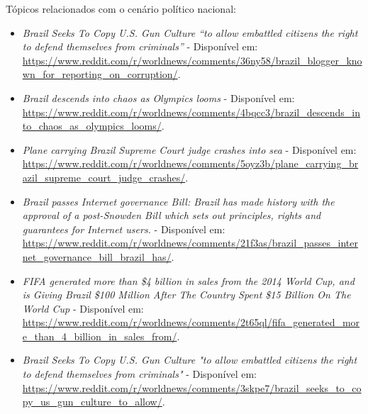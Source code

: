 Tópicos relacionados com o cenário político nacional:
\begin{itemize}
  \item
  \textit{Brazil Seeks To Copy U.S. Gun Culture ``to allow embattled
  citizens the right to defend themselves from
  criminals''} - Disponível em: 
  \url{https://www.reddit.com/r/worldnews/comments/36ny58/brazil_blogger_known_for_reporting_on_corruption/}.
  \item
  \textit{Brazil descends into chaos as Olympics looms} - Disponível em: 
  \url{https://www.reddit.com/r/worldnews/comments/4bqcc3/brazil_descends_into_chaos_as_olympics_looms/}.
  \item
  \textit{Plane carrying Brazil Supreme Court judge crashes into sea}
   - Disponível em: \url{https://www.reddit.com/r/worldnews/comments/5oyz3b/plane_carrying_brazil_supreme_court_judge_crashes/}.
  \item
  \textit{Brazil passes Internet governance Bill: Brazil has made history with
  the approval of a post-Snowden Bill which sets out principles, rights and guarantees for Internet users.} - Disponível em: \url{https://www.reddit.com/r/worldnews/comments/21f3as/brazil_passes_internet_governance_bill_brazil_has/}.
  \item
  \textit{FIFA generated more than \$4 billion in sales from the 2014 World Cup,
  and is Giving Brazil \$100 Million After The Country Spent \$15 Billion On The
  World Cup} - Disponível em: \url{https://www.reddit.com/r/worldnews/comments/2t65ql/fifa_generated_more_than_4_billion_in_sales_from/}.
  \item
  \textit{Brazil Seeks To Copy U.S. Gun Culture "to allow embattled citizens the
  right to defend themselves from
  criminals"} - Disponível em: \url{https://www.reddit.com/r/worldnews/comments/3skpe7/brazil_seeks_to_copy_us_gun_culture_to_allow/}.
\end{itemize}

